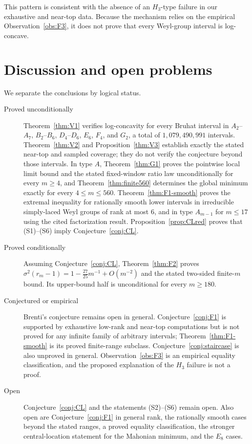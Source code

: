 \documentclass[11pt]{amsart}
\theoremstyle{plain}
\theoremstyle{definition}
\theoremstyle{remark}
\begin{document}
This pattern is consistent with the absence of an $H_3$-type failure in
our exhaustive and near-top data. Because the mechanism relies on the empirical Observation~\ref{obs:F3}, it does not prove that every Weyl-group interval
is log-concave.

\section{Discussion and open problems}
\label{sec:discussion}

We separate the conclusions by logical status.

\begin{description}
\item[Proved unconditionally] Theorem~\ref{thm:V1} verifies
log-concavity for every Bruhat interval in
$A_2$--$A_7$, $B_2$--$B_6$, $D_4$--$D_6$, $E_6$, $F_4$, and $G_2$, a
total of $1{,}079{,}490{,}991$ intervals. Theorem~\ref{thm:V2} and
Proposition~\ref{thm:V3} establish exactly the stated near-top and sampled
coverage; they do not verify the conjecture beyond those intervals. In
type $A$, Theorem~\ref{thm:G1} proves the pointwise local limit bound and
the stated fixed-window ratio law unconditionally for every $m\ge4$, and
Theorem~\ref{thm:finite560} determines the global minimum exactly for every
$4\le m\le560$. Theorem~\ref{thm:F1-smooth} proves the extremal inequality
for rationally smooth lower intervals in irreducible simply-laced Weyl
groups of rank at most $6$, and in type $A_{m-1}$ for $m\le17$ using the cited
factorization result. Proposition~\ref{prop:CLred} proves that (S1)--(S6)
imply Conjecture~\ref{conj:CL}.

\item[Proved conditionally] Assuming Conjecture~\ref{conj:CL},
Theorem~\ref{thm:F2} proves
$\sigma^2(r_m-1)=1-\tfrac{27}{25}m^{-1}+O(m^{-2})$ and the stated
two-sided finite-$m$ bound. Its upper-bound half is unconditional for every
$m\ge180$.

\item[Conjectured or empirical] Brenti's conjecture remains open in
general. Conjecture~\ref{conj:F1} is supported by exhaustive low-rank and
near-top computations but is not proved for any infinite family of
arbitrary intervals; Theorem~\ref{thm:F1-smooth} is its proved finite-range
subclass. Conjecture~\ref{conj:staircase} is also unproved in general.
Observation~\ref{obs:F3} is an empirical equality classification, and the
proposed explanation of the $H_3$ failure is not a proof.

\item[Open] Conjecture~\ref{conj:CL} and the statements (S2)--(S6)
remain open. Also open are Conjecture~\ref{conj:F1} in general rank, the
rationally smooth cases beyond the stated ranges, a proved equality
classification, the stronger central-location statement for the Mahonian
minimum, and the $E_8$ cases.
\end{description}
\end{document}

